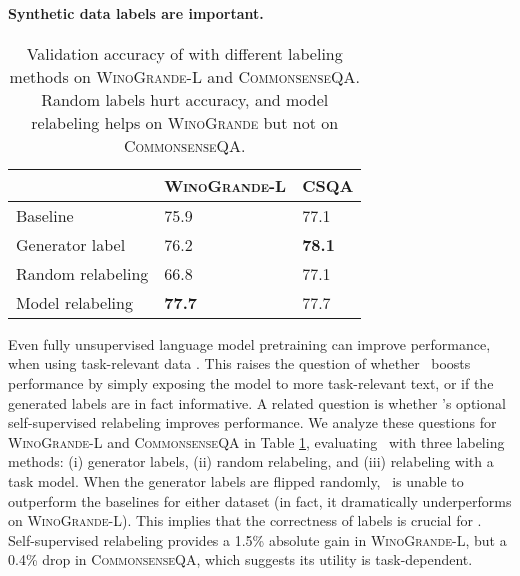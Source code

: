 \documentclass[11pt,a4paper]{article}
\newcommand{\gdaug}{}
\newcommand{\winogrande}{\textsc{WinoGrande}\xspace}
\newcommand{\comqa}{\textsc{CommonsenseQA}\xspace}
\begin{document}
\paragraph{Synthetic data labels are important.}

\begin{table}[hbt!]
\small
\centering
\begin{tabular}{lll}
   & \winogrande-L      &CSQA \\ \toprule
Baseline        &75.9           &77.1 \\ 
\midrule[0.03em]
Generator label  & 76.2     &\textbf{78.1}                       \\ 
Random relabeling    & 66.8  &77.1                          \\ 
Model relabeling & \textbf{77.7}        & 77.7    \\ \bottomrule
\end{tabular}
\caption{Validation accuracy of \gdaug with different labeling methods on \winogrande-L and \comqa. 
Random labels hurt accuracy, and model relabeling helps on \winogrande but not on \comqa .}
\label{relabel}
\end{table} Even fully unsupervised language model pretraining can improve performance, when using task-relevant data \cite{domains2020}.  
This raises the question of whether \gdaug\ boosts performance by simply exposing the model to more task-relevant text, or if the generated labels are in fact informative. 
A related question is whether \gdaug 's optional self-supervised relabeling improves performance. 
We analyze these questions for \winogrande-L and \comqa in Table \ref{relabel}, evaluating \gdaug\ with three labeling methods: (i) generator labels, (ii) random relabeling, and (iii) relabeling with a task model. 
When the generator labels are flipped randomly, \gdaug\ is unable to outperform the baselines for either dataset (in fact, it dramatically underperforms on \winogrande-L). 
This implies that the correctness of labels is crucial for \gdaug.
Self-supervised relabeling provides a 1.5\% absolute gain in \winogrande-L, but a 0.4\% drop in \comqa, which suggests its utility is task-dependent.
\end{document}
